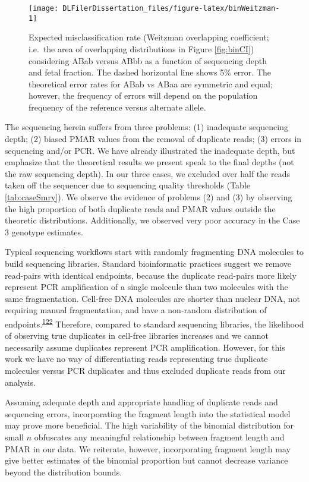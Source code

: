 \documentclass[11pt,letterpaper]{book}
\begin{document}
\begin{figure}

{\centering \texttt{[image: DLFilerDissertation\_files/figure-latex/binWeitzman-1]} 

}

\caption[(ref:binWeitzmanScap)]{Expected misclassification rate (Weitzman overlapping coefficient; i.e.~the area of overlapping distributions in Figure \ref{fig:binCI}) considering ABab versus ABbb as a function of sequencing depth and fetal fraction. The dashed horizontal line shows 5\% error. The theoretical error rates for ABab vs ABaa are symmetric and equal; however, the frequency of errors will depend on the population frequency of the reference versus alternate allele.}\label{fig:binWeitzman}
\end{figure}

The sequencing herein suffers from three problems: (1) inadequate sequencing depth; (2) biased PMAR values from the removal of duplicate reads; (3) errors in sequencing and/or PCR.
We have already illustrated the inadequate depth, but emphasize that the theoretical results we present speak to the final depths (not the raw sequencing depth).
In our three cases, we excluded over half the reads taken off the sequencer due to sequencing quality thresholds (Table \ref{tab:caseSmry}).
We observe the evidence of problems (2) and (3) by observing the high proportion of both duplicate reads and PMAR values outside the theoretic distributions.
Additionally, we observed very poor accuracy in the Case 3 genotype estimates.

Typical sequencing workflows start with randomly fragmenting DNA molecules to build sequencing libraries.
Standard bioinformatic practices suggest we remove read-pairs with identical endpoints, because the duplicate read-pairs more likely represent PCR amplification of a single molecule than two molecules with the same fragmentation.
Cell-free DNA molecules are shorter than nuclear DNA, not requiring manual fragmentation, and have a non-random distribution of endpoints.\textsuperscript{\protect\hyperlink{ref-chan:2016aa}{122}}
Therefore, compared to standard sequencing libraries, the likelihood of observing true duplicates in cell-free libraries increases and we cannot necessarily assume duplicates represent PCR amplification.
However, for this work we have no way of differentiating reads representing true duplicate molecules versus PCR duplicates and thus excluded duplicate reads from our analysis.

Assuming adequate depth and appropriate handling of duplicate reads and sequencing errors, incorporating the fragment length into the statistical model may prove more beneficial.
The high variability of the binomial distribution for small \(n\) obfuscates any meaningful relationship between fragment length and PMAR in our data.
We reiterate, however, incorporating fragment length may give better estimates of the binomial proportion but cannot decrease variance beyond the distribution bounds.
\end{document}
